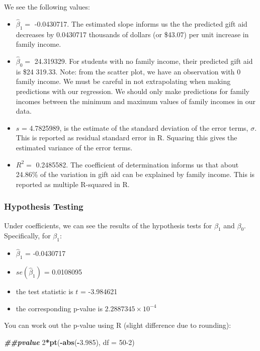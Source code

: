\documentclass[
]{book}
\newenvironment{Shaded}{\begin{snugshade}}{\end{snugshade}}
\newcommand{\AttributeTok}[1]{\textcolor[rgb]{0.13,0.29,0.53}{#1}}
\newcommand{\DecValTok}[1]{\textcolor[rgb]{0.00,0.00,0.81}{#1}}
\newcommand{\DocumentationTok}[1]{\textcolor[rgb]{0.56,0.35,0.01}{\textbf{\textit{#1}}}}
\newcommand{\FloatTok}[1]{\textcolor[rgb]{0.00,0.00,0.81}{#1}}
\newcommand{\FunctionTok}[1]{\textcolor[rgb]{0.13,0.29,0.53}{\textbf{#1}}}
\newcommand{\NormalTok}[1]{#1}
\newcommand{\SpecialCharTok}[1]{\textcolor[rgb]{0.81,0.36,0.00}{\textbf{#1}}}
\providecommand{\tightlist}{%
  \setlength{\itemsep}{0pt}\setlength{\parskip}{0pt}}
\begin{document}
We see the following values:

\begin{itemize}
\tightlist
\item
  \(\hat{\beta}_1 =\) -0.0430717. The estimated slope informs us the the predicted gift aid decreases by 0.0430717 thousands of dollars (or \$43.07) per unit increase in family income.
\item
  \(\hat{\beta}_0 =\) 24.319329. For students with no family income, their predicted gift aid is \$24 319.33. Note: from the scatter plot, we have an observation with 0 family income. We must be careful in not extrapolating when making predictions with our regression. We should only make predictions for family incomes between the minimum and maximum values of family incomes in our data.
\item
  \(s\) = 4.7825989, is the estimate of the standard deviation of the error terms, \(\sigma\). This is reported as residual standard error in R. Squaring this gives the estimated variance of the error terms.
\item
  \(R^2 =\) 0.2485582. The coefficient of determination informs us that about 24.86\% of the variation in gift aid can be explained by family income. This is reported as multiple R-squared in R.
\end{itemize}

\subsubsection*{Hypothesis Testing}\label{hypothesis-testing-2}

Under coefficients, we can see the results of the hypothesis tests for \(\beta_1\) and \(\beta_0\). Specifically, for \(\beta_1\):

\begin{itemize}
\tightlist
\item
  \(\hat{\beta}_1\) = -0.0430717
\item
  \(se(\hat{\beta}_1)\) = 0.0108095
\item
  the test statistic is \(t\) = -3.984621
\item
  the corresponding p-value is \ensuremath{2.2887345\times 10^{-4}}
\end{itemize}

You can work out the p-value using R (slight difference due to rounding):

\begin{Shaded}
\begin{Highlighting}[]
\DocumentationTok{\#\#pvalue}
\DecValTok{2}\SpecialCharTok{*}\FunctionTok{pt}\NormalTok{(}\SpecialCharTok{{-}}\FunctionTok{abs}\NormalTok{(}\SpecialCharTok{{-}}\FloatTok{3.985}\NormalTok{), }\AttributeTok{df =} \DecValTok{50{-}2}\NormalTok{)}
\end{Highlighting}
\end{Shaded}
\end{document}
